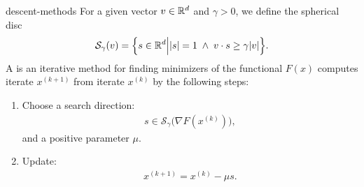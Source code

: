 \begin{Definition}{descent-methods}
  For a given vector $v \in \mathbb R^d$ and $\gamma > 0$, we define the
  spherical disc
    \begin{gather}
    \label{eq:descent-methods:1}
    \mathcal S_\gamma(v) = \Bigl\{s\in \mathbb R^d \Big|
    \lvert s\rvert = 1 \;\wedge \;
    v\cdot s \ge \gamma \lvert v\rvert \Bigr\}.
  \end{gather}
  A  is an iterative method for finding
  minimizers of the functional $F(x)$ computes iterate $x^{(k+1)}$
  from iterate $x^{(k)}$ by the following steps:
  \begin{enumerate}
  \item Choose a search direction:
    \begin{gather*}
      s \in \mathcal S_\gamma\bigl(\nabla F(x^{(k)})\bigr),
    \end{gather*}
    and a positive parameter $\mu$.
  \item Update:
    \begin{gather*}
      x^{(k+1)} = x^{(k)} -\mu s.
    \end{gather*}
  \end{enumerate}
\end{Definition}
